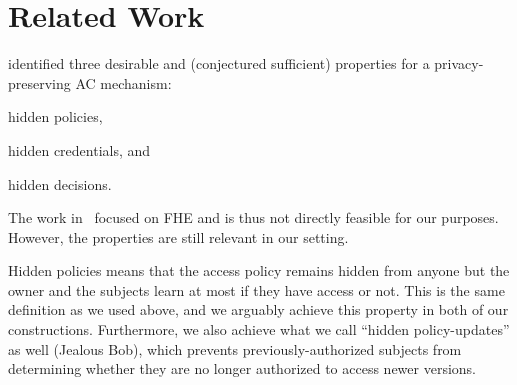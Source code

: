 






\section{Related Work}\label{RelatedWork}


\citet{TowardsPPACwHPHCHD} identified three desirable and (conjectured 
sufficient) properties for a privacy-preserving \ac{AC} mechanism:
\begin{inparablank}
\item hidden policies,
\item hidden credentials, and
\item hidden decisions.
\end{inparablank}
The work in~\cite{TowardsPPACwHPHCHD} focused on \ac{FHE} and is thus not 
directly feasible for our purposes.
However, the properties are still relevant in our setting.

Hidden policies means that the access policy remains hidden from anyone but 
the owner and the subjects learn at most if they have access or not.
This is the same definition as we used above, and we arguably achieve this 
property in both of our constructions.
Furthermore, we also achieve what we call \enquote{hidden policy-updates} as 
well (Jealous Bob), which prevents previously-authorized subjects from 
determining whether they are no longer authorized to access newer versions.


